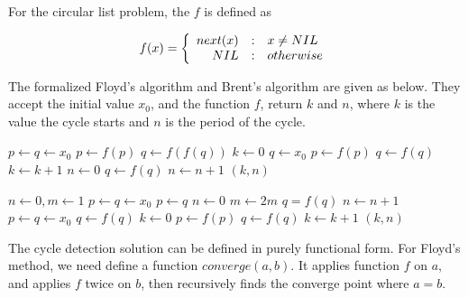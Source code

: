 \documentclass{article}
\begin{document}
For the circular list problem, the $f$ is defined as

\begin{equation}
f(x) = \left \{
  \begin{array}
  {r@{\quad:\quad}l}
  next(x) & x \neq NIL \\
  NIL & otherwise
  \end{array}
\right.
\end{equation}

The formalized Floyd's algorithm and Brent's algorithm are given as below. They accept the initial value
$x_0$, and the function $f$, return $k$ and $n$, where $k$ is the value the cycle starts and $n$ is the
period of the cycle.

\begin{algorithmic}[1]
  \State $p \gets q \gets x_0$ 
  \Repeat
    \State $p \gets f(p)$
    \State $q \gets f(f(q))$
   
  \Statex
  \State $k \gets 0$
  \State $q \gets x_0$ 
   
    \State $p \gets f(p)$
    \State $q \gets f(q)$
    \State $k \gets k + 1$
  \EndWhile
  \Statex
  \State $n \gets 0$
  \Repeat {}
    \State $q \gets f(q)$
    \State $n \gets n + 1$
  \State \Return $(k, n)$
\EndFunction
\end{algorithmic}

\begin{algorithmic}[1]
  \State $n \gets 0, m \gets 1$
  \State $p \gets q \gets x_0$
  \Repeat{}
      \State $p \gets q$ 
      \State $n \gets 0$
      \State $m \gets 2m$
    \EndIf
    \State $q = f(q)$
    \State $n \gets n + 1$
   
  \Statex
  \State $ p \gets q \gets x_0$ 
   
    \State $q \gets f(q)$
  \EndLoop
  \Statex
  \State $k \gets 0$
   
    \State $p \gets f(p)$
    \State $q \gets f(q)$
    \State $k \gets k + 1$
  \EndWhile
  \State \Return $(k, n)$
\EndFunction
\end{algorithmic}

The cycle detection solution can be defined in purely functional form. For Floyd's method, we
need define a function $converge(a, b)$. It applies function $f$ on $a$, and applies $f$ twice
on $b$, then recursively finds the converge point where $a = b$.
\end{document}
